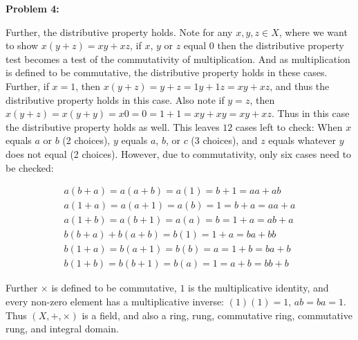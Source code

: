 \documentclass[12pt, letterpaper]{article}
\newenvironment{problem}
    [1]
    {\noindent \textbf{Problem #1:}}
    {\vspace{3mm}}
\begin{document}
\begin{problem}{4}
\begin{enumerate}[(a)]
        Further, the distributive property holds. Note for any $x, y, z \in X$, where we want to show $x(y + z) = xy + xz$,
        if $x$, $y$ or $z$ equal $0$ then the distributive property test becomes a test of the commutativity of multiplication. 
        And as multiplication is defined to be commutative, the distributive property holds in these cases. Further, if $x = 1$,
        then $x(y + z) = y + z = 1y + 1z = xy + xz$, and thus the distributive property holds in this case. Also note if $y = z$,
        then $x(y + z) = x(y + y) = x0 = 0 = 1 + 1 = xy + xy = xy + xz$. Thus in this case the distributive property holds as well.
        This leaves $12$ cases left to check: When $x$ equals $a$ or $b$ (2 choices), $y$ equals $a$, $b$, or $c$ (3 choices), and 
        $z$ equals whatever $y$ does not equal (2 choices). However, due to commutativity, only six cases need to be checked:

        \begin{align*}
            a(b + a) = a(a + b) = a(1) = b + 1  = aa + ab\\
            a(1 + a) = a(a + 1) = a(b) = 1 = b + a = aa + a\\
            a(1 + b) = a(b + 1) = a(a) = b = 1 + a = ab + a\\
            b(b + a) + b(a + b) = b(1) = 1 + a = ba + bb \\
            b(1 + a) = b(a + 1) = b(b) = a = 1 + b = ba + b\\
            b(1 + b) = b(b + 1) = b(a) = 1 = a + b = bb + b
        \end{align*}

        Further $\times$ is defined to be commutative, $1$ is the multiplicative identity, and every non-zero element has a 
        multiplicative inverse: $(1)(1) = 1$, $ab = ba = 1$. Thus $(X, +, \times)$ is a field, and also a ring, rung, commutative 
        ring, commutative rung, and integral domain.
    \end{enumerate}
\end{problem}
\end{document}

